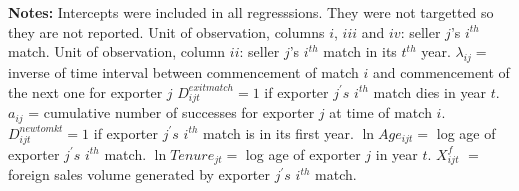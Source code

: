 \documentclass[12pt]{article}
\begin{document}
\begin{table}[tbp]
{}\endcenter
\par
\begin{tablenotes}
\item \textbf{Notes:} Intercepts were included in all regresssions. They were not targetted so they are not reported. Unit of observation, columns $i$,  $iii$ and $iv$: seller $ j$'s $i^{th}$ match. Unit of observation, column $ii$: seller $ j$'s $i^{th}$ match in its $t^{th}$ year. $\lambda_{ij}=$ inverse of time interval between commencement of match $i$ and commencement of the next one for exporter $j$ $D_{ijt}^{exit match}=1$ if exporter $j^{\prime }s$ $i^{th}$ match dies in year $t$. $a_{ij} $ = cumulative number of successes for exporter $j$ at time of match $i$. $D_{ijt}^{new to mkt}=1$ if exporter $j^{\prime }s$ $i^{th}$ match is in its first year. $\ln Age_{ijt}=$ log age of exporter $j^{\prime }s$ $i^{th}$  match. $\ln Tenure_{jt} =$ log age of exporter $j$ in year $t$. $X_{ijt}^{f}$ $=$ foreign sales volume generated by exporter $j^{\prime }s$ $i^{th}$ match.
\end{tablenotes}
\end{table}
\end{document}
